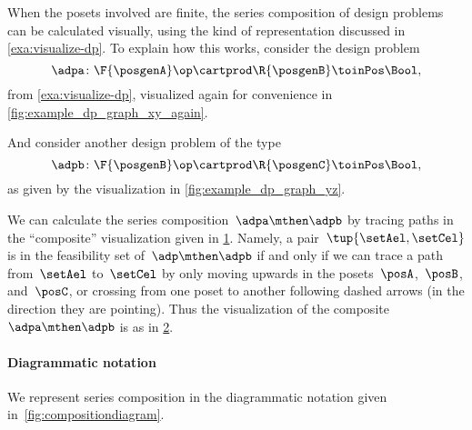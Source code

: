 When the posets involved are finite, the series composition of design problems can be calculated visually, using the kind of representation discussed in \cref{exa:visualize-dp}.
To explain how this works, consider the design problem
\begin{equation*}
    \adpa \colon \F{\posgenA} \op \cartprod  \R{\posgenB} \toinPos \Bool,
\end{equation*}
from \cref{exa:visualize-dp}, visualized again for convenience in \cref{fig:example_dp_graph_xy_again}.
\begin{marginfigure}
    \centering
    \caption{ }
    \label{fig:example_dp_graph_xy_again}
\end{marginfigure}
And consider another design problem of the type
\begin{equation*}
    \adpb \colon \F{\posgenB} \op \cartprod  \R{\posgenC} \toinPos \Bool,
\end{equation*}
as given by the visualization in \cref{fig:example_dp_graph_yz}.
\begin{marginfigure}
    \centering
    \caption{ }
    \label{fig:example_dp_graph_yz}
\end{marginfigure}
We can calculate the series composition~$\adpa \mthen \adpb$ by tracing paths in the ``composite'' visualization given in \cref{fig:example_dp_graph_xyz}.
Namely, a pair~$\tup{\setAel, \setCel}$ is in the feasibility set of~$\adp \mthen \adpb$ if and only if we can trace a path from~$\setAel$ to~$\setCel$ by only moving upwards in the posets~$\posA$,~$\posB$, and~$\posC$, or crossing from one poset to another following dashed arrows (in the direction they are pointing).
Thus the visualization of the composite~$\adpa \mthen \adpb$ is as in \cref{fig:example_dp_graph_xz}.
\begin{figure}[h!]
    \centering
    \caption{}
    \label{fig:example_dp_graph_xyz}
\end{figure}
\begin{figure}[h!]
    \centering
    \caption{}
    \label{fig:example_dp_graph_xz}
\end{figure}


\paragraph{Diagrammatic notation}
We represent series composition in the diagrammatic notation given in~\cref{fig:compositiondiagram}.

